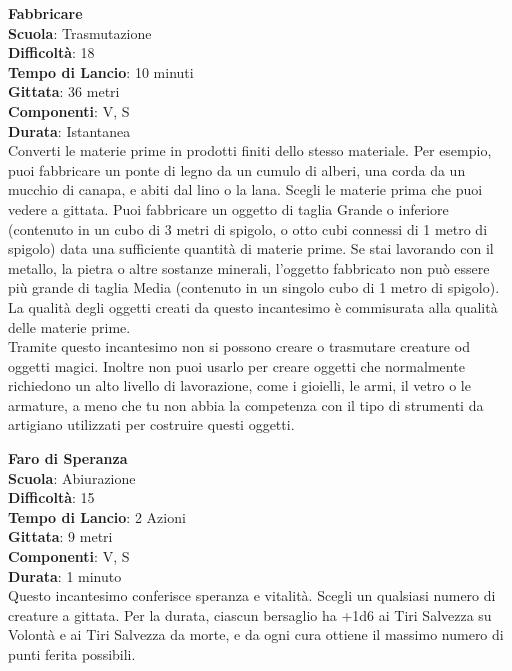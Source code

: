 \begin{multicols}{2}
\medskip\textbf{Fabbricare}\\
\textbf{Scuola}: Trasmutazione\\
\textbf{Difficoltà}:  18\\
\textbf{Tempo di Lancio}: 10 minuti\\
\textbf{Gittata}: 36 metri\\
\textbf{Componenti}: V, S\\
\textbf{Durata}: Istantanea\\
Converti le materie prime in prodotti finiti dello stesso materiale. Per esempio, puoi fabbricare un ponte di legno da un cumulo di alberi, una corda da un mucchio di canapa, e abiti dal lino o la lana. Scegli le materie prima che puoi vedere a gittata. Puoi fabbricare un oggetto di taglia Grande o inferiore (contenuto in un cubo di 3 metri di spigolo, o otto cubi connessi di 1 metro di spigolo) data una sufficiente quantità di materie prime. Se stai lavorando con il metallo, la pietra o altre sostanze minerali, l’oggetto fabbricato non può essere più grande di taglia Media (contenuto in un singolo cubo di 1 metro di spigolo). La qualità degli oggetti creati da questo incantesimo è commisurata alla qualità delle materie prime.\\
Tramite questo incantesimo non si possono creare o trasmutare creature od oggetti magici. Inoltre non puoi usarlo per creare oggetti che normalmente richiedono un alto livello di lavorazione, come i gioielli, le armi, il vetro o le armature, a meno che tu non abbia la competenza con il tipo di strumenti da artigiano utilizzati per costruire questi oggetti.

\medskip\textbf{Faro di Speranza}\\
\textbf{Scuola}: Abiurazione\\
\textbf{Difficoltà}:  15\\
\textbf{Tempo di Lancio}: 2 Azioni\\
\textbf{Gittata}: 9 metri\\
\textbf{Componenti}: V, S\\
\textbf{Durata}: 1 minuto\\
Questo incantesimo conferisce speranza e vitalità. Scegli un qualsiasi numero di creature a gittata. Per la durata, ciascun bersaglio ha +1d6 ai Tiri Salvezza su Volontà e ai Tiri Salvezza da morte, e da ogni cura ottiene il massimo numero di punti ferita possibili.


\end{multicols}
